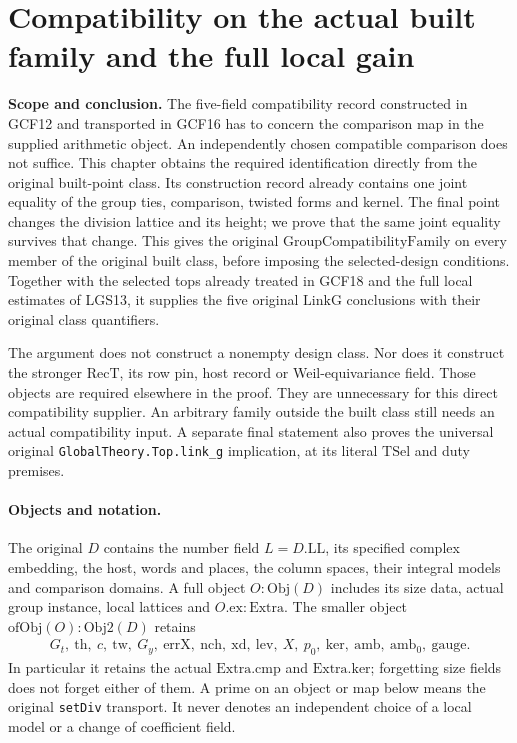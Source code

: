 \documentclass[11pt,a4paper]{article}
\numberwithin{equation}{section}
\theoremstyle{remark}\newtheorem{remark}[theorem]{Remark}
\begin{document}
\section{Compatibility on the actual built family and the full local gain}
\label{sec:witness-realization-v049}

\noindent\textbf{Scope and conclusion.}
The five-field compatibility record constructed in GCF12 and transported
in GCF16 has to concern the comparison map in the supplied arithmetic
object.  An independently chosen compatible comparison does not suffice.
This chapter obtains the required identification directly from the
original built-point class.  Its construction record already contains
one joint equality of the group ties, comparison, twisted forms and
kernel.  The final point changes the division lattice and its height;
we prove that the same joint equality survives that change.  This gives
the original \(\mathrm{GroupCompatibilityFamily}\) on every member of
the original built class, before imposing the selected-design conditions.
Together with the selected tops already treated in GCF18 and the full
local estimates of LGS13, it supplies the five original
\(\mathrm{LinkG}\) conclusions with their original class quantifiers.

The argument does not construct a nonempty design class.  Nor does it
construct the stronger \(\mathrm{RecT}\), its row pin, host record or
Weil-equivariance field.  Those objects are required elsewhere in the
proof.  They are unnecessary for this direct compatibility supplier.
An arbitrary family outside the built class still needs an actual
compatibility input.  A separate final statement also proves the
universal original \texttt{Global\allowbreak Theory.\allowbreak Top.\allowbreak link\_\allowbreak g} implication, at its
literal \(\mathrm{TSel}\) and duty premises.

\paragraph{Objects and notation.}
The original \(D\) contains the number field \(L=D.\mathrm{LL}\), its
specified complex embedding, the host, words and places, the column
spaces, their integral models and comparison domains.  A full object
\(O:\mathrm{Obj}(D)\) includes its size data, actual group instance,
local lattices and \(O.\mathrm{ex}:\mathrm{Extra}\).
The smaller object \(\mathrm{ofObj}(O):\mathrm{Obj2}(D)\) retains
\[
 \begin{gathered}
 G_t,\ \mathrm{th},\ c,\ \mathrm{tw},\ G_y,\
 \mathrm{errX},\ \mathrm{nch},\ \mathrm{xd},\ \mathrm{lev},\
 X,\ p_0,\ \mathrm{ker},\ \mathrm{amb},\ \mathrm{amb}_0,\
 \mathrm{gauge}.
 \end{gathered}
\]
In particular it retains the actual \(\mathrm{Extra}.\mathrm{cmp}\)
and \(\mathrm{Extra}.\mathrm{ker}\); forgetting size fields does not
forget either of them.  A prime on an object or map below means the
original \texttt{set\allowbreak Div} transport.  It never denotes an independent
choice of a local model or a change of coefficient field.
\end{document}
